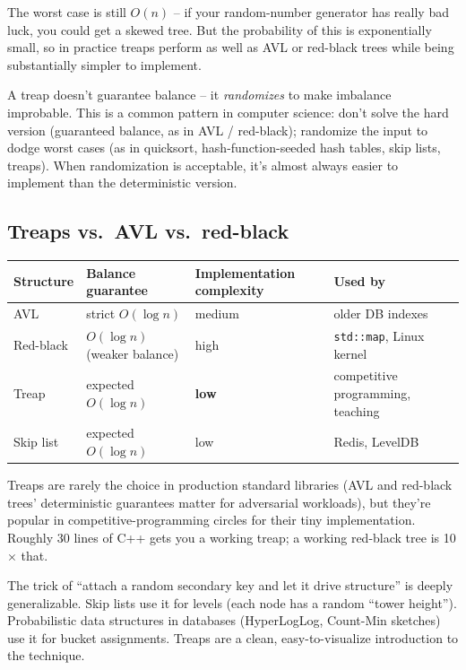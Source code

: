 \documentclass[11pt]{article}
\begin{document}
The worst case is still $O(n)$ -- if your random-number generator has really bad luck, you could get a skewed tree. But the probability of this is exponentially small, so in practice treaps perform as well as AVL or red-black trees while being substantially simpler to implement.

\begin{ideabox}
A treap doesn't guarantee balance -- it \emph{randomizes} to make imbalance improbable. This is a common pattern in computer science: don't solve the hard version (guaranteed balance, as in AVL / red-black); randomize the input to dodge worst cases (as in quicksort, hash-function-seeded hash tables, skip lists, treaps). When randomization is acceptable, it's almost always easier to implement than the deterministic version.
\end{ideabox}

\subsection*{Treaps vs.\ AVL vs.\ red-black}

\begin{center}
\begin{tabular}{llll}
Structure & Balance guarantee & Implementation complexity & Used by \\
\hline
AVL         & strict $O(\log n)$           & medium   & older DB indexes \\
Red-black   & $O(\log n)$ (weaker balance) & high     & \texttt{std::map}, Linux kernel \\
Treap       & expected $O(\log n)$         & \textbf{low} & competitive programming, teaching \\
Skip list   & expected $O(\log n)$         & low       & Redis, LevelDB \\
\end{tabular}
\end{center}

Treaps are rarely the choice in production standard libraries (AVL and red-black trees' deterministic guarantees matter for adversarial workloads), but they're popular in competitive-programming circles for their tiny implementation. Roughly 30 lines of C++ gets you a working treap; a working red-black tree is 10$\times$ that.

\begin{notebox}
The trick of ``attach a random secondary key and let it drive structure'' is deeply generalizable. Skip lists use it for levels (each node has a random ``tower height''). Probabilistic data structures in databases (HyperLogLog, Count-Min sketches) use it for bucket assignments. Treaps are a clean, easy-to-visualize introduction to the technique.
\end{notebox}
\end{document}
